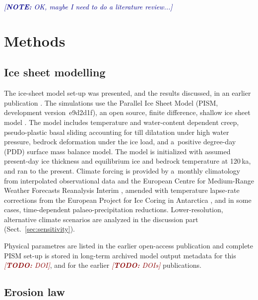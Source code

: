 \documentclass[utf8]{article}
\newcommand{\note}[1]{\textcolor{darkblue}{\emph{[\textbf{NOTE:} #1]}}}
\newcommand{\todo}[1]{\textcolor{darkred}{\emph{[\textbf{TODO:} #1]}}}
\begin{document}
    \note{OK, maybe I need to do a literature review...}

\section{Methods}

\subsection{Ice sheet modelling}

    The ice-sheet model set-up was presented, and the results discussed, in an
    earlier publication \citep{Seguinot.etal.2018}. The simulations use the
    Parallel Ice Sheet Model (PISM, development version~e9d2d1f), an open
    source, finite difference, shallow ice sheet model
    \citep{PISM-authors.2017}. The model includes temperature and water-content
    dependent creep, pseudo-plastic basal sliding accounting for till
    dilatation under high water pressure, bedrock deformation under the ice
    load, and a~positive degree-day (PDD) surface mass balance model. The model
    is initialized with assumed present-day ice thickness and equilibrium
    ice and bedrock temperature at 120\,ka, and ran to the present.
    Climate forcing is provided by a~monthly climatology from interpolated
    observational data \citep[WorldClim;][]{Hijmans.etal.2005} and the European
    Centre for Medium-Range Weather Forecasts Reanalysis Interim
    \citep[ERA-Interim;][]{Dee.etal.2011}, amended with temperature lapse-rate
    corrections from the European Project for Ice Coring in Antarctica
    \citep[EPICA;][] {Jouzel.etal.2007}, and in some cases, time-dependent
    palaeo-precipitation reductions. Lower-resolution, alternative climate
    scenarios are analyzed in the discussion part
    (Sect.~\ref{sec:sensitivity}).

    Physical parametres are listed in the earlier open-access publication
    \citep{Seguinot.etal.2018} and complete PISM set-up is stored in long-term
    archived model output metadata for this \todo{DOI}, and for the earlier
    \todo{DOIs} publications.

\subsection{Erosion law}
\end{document}

